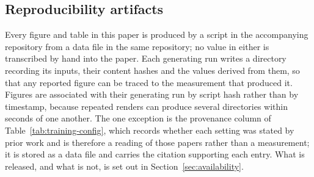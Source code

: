 \subsection{Reproducibility artifacts}
\label{sec:artifacts}

Every figure and table in this paper is produced by a script in the accompanying
repository from a data file in the same repository; no value in either is
transcribed by hand into the paper. Each generating run writes a directory
recording its inputs, their content hashes and the values derived from them, so
that any reported figure can be traced to the measurement that produced it.
Figures are associated with their generating run by script hash rather than by
timestamp, because repeated renders can produce several directories within
seconds of one another. The one exception is the provenance column of
Table~\ref{tab:training-config}, which records whether each setting was stated by
prior work and is therefore a reading of those papers rather than a measurement;
it is stored as a data file and carries the citation supporting each entry. What
is released, and what is not, is set out in Section~\ref{sec:availability}.
